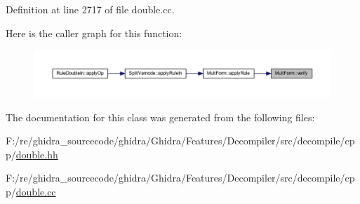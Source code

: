 Definition at line 2717 of file double.\+cc.

Here is the caller graph for this function\+:
\nopagebreak
\begin{figure}[H]
\begin{center}
\leavevmode
\includegraphics[width=350pt]{class_mult_form_a8426ce4e5ea488cb5e73a5ca2d24673e_icgraph}
\end{center}
\end{figure}


The documentation for this class was generated from the following files\+:\begin{DoxyCompactItemize}
\item 
F\+:/re/ghidra\+\_\+sourcecode/ghidra/\+Ghidra/\+Features/\+Decompiler/src/decompile/cpp/\mbox{\hyperlink{double_8hh}{double.\+hh}}\item 
F\+:/re/ghidra\+\_\+sourcecode/ghidra/\+Ghidra/\+Features/\+Decompiler/src/decompile/cpp/\mbox{\hyperlink{double_8cc}{double.\+cc}}\end{DoxyCompactItemize}
